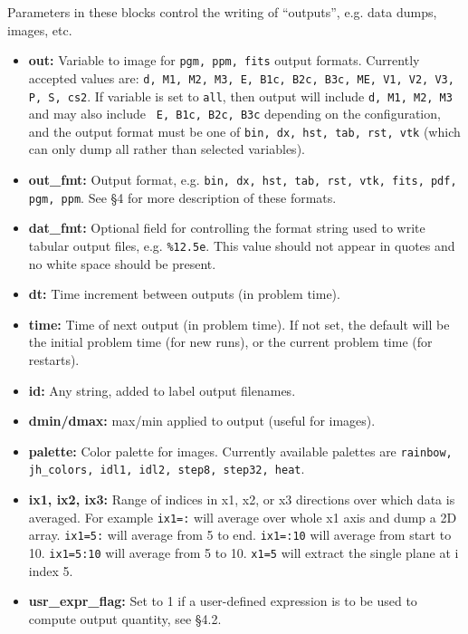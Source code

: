 Parameters in these blocks control the writing of ``outputs'',
e.g. data dumps, images, etc.
\begin{itemize}

\item {\bf out:} Variable to image for {\tt pgm, ppm, fits} output
formats.  Currently accepted values are: {\tt d, M1, M2, M3, E, B1c,
B2c, B3c, ME, V1, V2, V3, P, S, cs2}.  If variable is set to {\tt all},
then output will include {\tt d, M1, M2, M3} and may also include {\tt
E, B1c, B2c, B3c} depending on the configuration, and the output format
must be one of {\tt bin, dx, hst, tab, rst, vtk} (which can only dump
all rather than selected variables).

\item {\bf out\_fmt:} Output format, e.g.  
{\tt bin, dx, hst, tab, rst, vtk, fits, pdf, pgm, ppm}.  See \S 4 for more
description of these formats.

\item {\bf dat\_fmt:} Optional field for controlling the format string used 
to write tabular output files, e.g. {\tt \%12.5e}.  This value should
not appear in quotes and no white space should be present.

\item {\bf dt:} Time increment between outputs (in problem time).

\item {\bf time:} Time of next output (in problem time).  If not set,
the default will be the initial problem time (for new runs), or the
current problem time (for restarts).

\item {\bf id:} Any string, added to label output filenames.

\item {\bf dmin/dmax:} max/min applied to output (useful for images).

\item {\bf palette:} Color palette for images.  Currently available palettes
are {\tt rainbow, jh\_colors, idl1, idl2, step8, step32, heat}.

\item {\bf ix1, ix2, ix3:} Range of indices in x1, x2, or x3 directions over
which data is averaged.  For example {\tt ix1=:} will average over whole x1 axis
and dump a 2D array.  {\tt ix1=5:} will average from 5 to end. {\tt ix1=:10}
will average from start to 10. {\tt ix1=5:10} will average from 5 to 10.
{\tt x1=5} will extract the single plane at i index 5.

\item {\bf usr\_expr\_flag:} Set to 1 if a user-defined expression is to
be used to compute output quantity, see \S 4.2.

\end{itemize}

